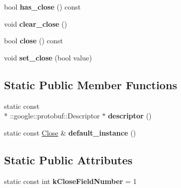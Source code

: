 \begin{DoxyCompactItemize}
\item 
\hypertarget{class_close_ac85b7e010a254d4778e91d42fb95ff47}{bool {\bfseries has\-\_\-close} () const }\label{class_close_ac85b7e010a254d4778e91d42fb95ff47}

\item 
\hypertarget{class_close_abf4dedd7abc99a939cd94219853b152d}{void {\bfseries clear\-\_\-close} ()}\label{class_close_abf4dedd7abc99a939cd94219853b152d}

\item 
\hypertarget{class_close_a300dbccf28dbbcbf9636f197d23bc44a}{bool {\bfseries close} () const }\label{class_close_a300dbccf28dbbcbf9636f197d23bc44a}

\item 
\hypertarget{class_close_a4557b1b27a9b4934714379e4797ba5c8}{void {\bfseries set\-\_\-close} (bool value)}\label{class_close_a4557b1b27a9b4934714379e4797ba5c8}

\end{DoxyCompactItemize}
\subsection*{Static Public Member Functions}
\begin{DoxyCompactItemize}
\item 
\hypertarget{class_close_a42a5f68ed3c237f2d54319a4f8e1c5f5}{static const \\*
\-::google\-::protobuf\-::\-Descriptor $\ast$ {\bfseries descriptor} ()}\label{class_close_a42a5f68ed3c237f2d54319a4f8e1c5f5}

\item 
\hypertarget{class_close_a90105787bd12a6ac106a06bb39b0b034}{static const \hyperlink{class_close}{Close} \& {\bfseries default\-\_\-instance} ()}\label{class_close_a90105787bd12a6ac106a06bb39b0b034}

\end{DoxyCompactItemize}
\subsection*{Static Public Attributes}
\begin{DoxyCompactItemize}
\item 
\hypertarget{class_close_ae10c316a91463074882301092a5c07b1}{static const int {\bfseries k\-Close\-Field\-Number} = 1}\label{class_close_ae10c316a91463074882301092a5c07b1}

\end{DoxyCompactItemize}
